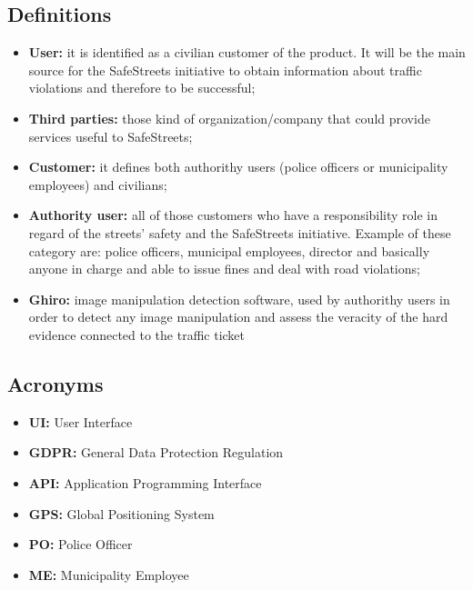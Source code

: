         \subsection{Definitions}
        \begin{itemize}            
            \item \textbf{User:} it is identified as a civilian customer of the
            product. It will be the main source for the SafeStreets initiative
            to obtain information about traffic violations and therefore to be
            successful;
            \item \textbf{Third parties:} those kind of organization/company that
            could provide services useful to SafeStreets; 
            \item \textbf{Customer:} it defines both authorithy users (police
            officers or municipality employees) and civilians; 
            \item \textbf{Authority user:} all of those customers who have a
            responsibility role in regard of the streets' safety and the
            SafeStreets initiative. Example of these category are: police
            officers, municipal employees, director and basically anyone in
            charge and able to issue fines and deal with road violations; 
            \item \textbf{Ghiro:} image manipulation detection software, used by
            authorithy users in order to detect any image manipulation and
            assess the veracity of the hard evidence connected to the traffic
            ticket\\
        \end{itemize}
        
        \subsection{Acronyms}
        \begin{itemize}
            \item \textbf{UI:} User Interface 
            \item \textbf{GDPR:} General Data Protection Regulation 
            \item \textbf{API:} Application Programming Interface
            \item \textbf{GPS:} Global Positioning System 
            \item \textbf{PO:} Police Officer 
            \item \textbf{ME:} Municipality Employee
        \end{itemize}
    
